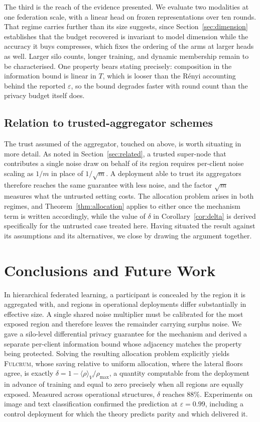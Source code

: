 \documentclass[acmsmall,screen,review,anonymous]{acmart}
\theoremstyle{acmdefinition}%
\newcommand{\Fulcrum}{\textsc{Fulcrum}\xspace}
\begin{document}
The third is the reach of the evidence presented. We evaluate two modalities at
one federation scale, with a linear head on frozen representations over ten
rounds. That regime carries further than its size suggests, since
Section~\ref{sec:dimension} establishes that the budget recovered is invariant to
model dimension while the accuracy it buys compresses, which fixes the ordering of
the arms at larger heads as well. Larger silo counts, longer training, and dynamic
membership remain to be characterised. One property bears stating precisely:
composition in the information bound is linear in $T$, which is looser than the
R\'enyi accounting behind the reported $\varepsilon$, so the bound degrades faster
with round count than the privacy budget itself does.

\subsection{Relation to trusted-aggregator schemes}

The trust assumed of the aggregator, touched on above, is worth situating in more
detail. As noted in Section~\ref{sec:related}, a trusted super-node that
contributes a single noise draw on behalf of its region requires per-client noise
scaling as $1/m$ in place of $1/\sqrt{m}$. A deployment able to trust its
aggregators therefore reaches the same guarantee with less noise, and the factor
$\sqrt{m}$ measures what the untrusted setting costs. The allocation problem
arises in both regimes, and Theorem~\ref{thm:allocation} applies to either once
the mechanism term is written accordingly, while the value of $\delta$ in
Corollary~\ref{cor:delta} is derived specifically for the untrusted case treated
here. Having situated the result against its assumptions and its alternatives, we
close by drawing the argument together.

\section{Conclusions and Future Work}
\label{sec:conclusion}

In hierarchical federated learning, a participant is concealed by the region it
is aggregated with, and regions in operational deployments differ substantially
in effective size. A single shared noise multiplier must be calibrated for the
most exposed region and therefore leaves the remainder carrying surplus noise. We
gave a silo-level differential privacy guarantee for the mechanism and derived a
separate per-client information bound whose adjacency matches the property being
protected. Solving the resulting allocation problem explicitly yields \Fulcrum,
whose saving relative to uniform allocation, where the lateral floors agree, is
exactly $\delta = 1 - \langle \rho \rangle_V / \rho_{\max}$, a quantity computable
from the deployment in advance of training and equal to zero precisely when all
regions are equally exposed. Measured across operational structures, $\delta$
reaches $88\%$. Experiments on image and text classification confirmed the
prediction at $\varepsilon = 0.99$, including a control deployment for which the
theory predicts parity and which delivered it.
\end{document}
